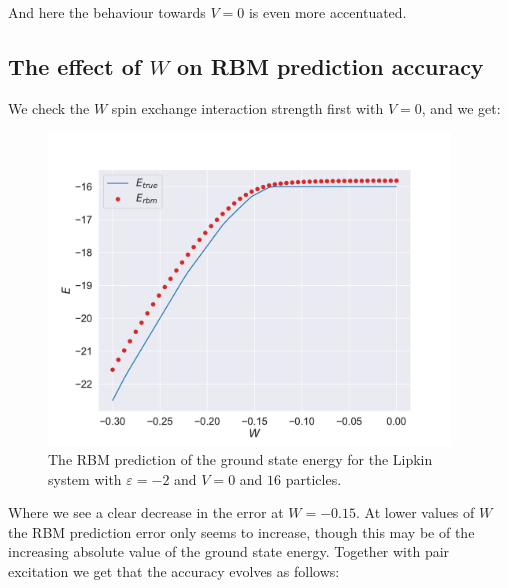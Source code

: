 And here the behaviour towards $V=0$ is even more accentuated.

\subsection{The effect of \texorpdfstring{$W$}{W} on RBM prediction accuracy}

We check the $W$ spin exchange interaction strength first with $V=0$, and we get:

\begin{figure}[H]
  \begin{center}
    \includegraphics[width=0.95\textwidth]{Figures/Plots/Lipkin/val-true[W][-0.3-0.0][e=850][n=16][eps=-2][V=0].pdf}
  \end{center}
  \caption{The RBM prediction of the ground state energy for the Lipkin system with $\varepsilon=-2$ and $V=0$ and $16$ particles.}
\end{figure}

Where we see a clear decrease in the error at $W=-0.15$. At lower values of $W$ the RBM prediction error only seems to increase, though this may be of the increasing absolute value of the ground state energy. Together with pair excitation we get that the accuracy evolves as follows:

